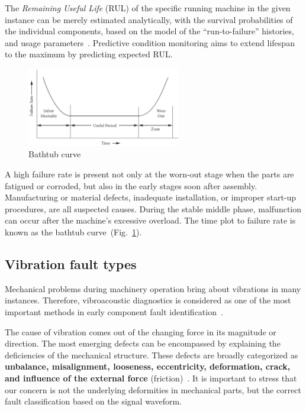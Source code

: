 The \emph{Remaining Useful Life} (RUL) of the specific running machine in the given instance can be merely estimated analytically, with the survival probabilities of the individual components, based on the model of the ``run-to-failure'' histories, and usage parameters~\cite{okoh_overview_2014}. Predictive condition monitoring aims to extend lifespan to the maximum by predicting expected RUL.

\begin{figure}[ht]
	\centering
	\includegraphics[width=0.6\textwidth]{assets/analysis/bath-tub-curve.png}
	\caption{Bathtub curve~\cite{mohanty_machinery_2015}}
	\label{fig:bathtub-curve}
\end{figure}

A high failure rate is present not only at the worn-out stage when the parts are fatigued or corroded, but also in the early stages soon after assembly. Manufacturing or material defects, inadequate installation, or improper start-up procedures, are all suspected causes. During the stable middle phase, malfunction can occur after the machine's excessive overload. The time plot to failure rate is known as the bathtub curve~(Fig.~\ref{fig:bathtub-curve}).

\subsection{Vibration fault types}
Mechanical problems during machinery operation bring about vibrations in many instances. Therefore, vibroacoustic diagnostics is considered as one of the most important methods in early component fault identification~\cite{ziaran_technicka_2013}.

The cause of vibration comes out of the changing force in its magnitude or direction. The most emerging defects can be encompassed by explaining the deficiencies of the mechanical structure. These defects are broadly categorized as \textbf{unbalance, misalignment, looseness, eccentricity, deformation, crack, and influence of the external force} (friction)~\cite{davies_handbook_2012}. It is important to stress that our concern is not the underlying deformities in mechanical parts, but the correct fault classification based on the signal waveform.


